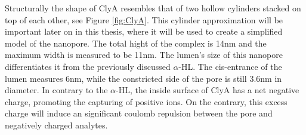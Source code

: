 Structurally the shape of ClyA resembles that of two hollow cylinders stacked on top of
each other, see Figure \ref{fig:ClyA}. This cylinder approximation will be important
later on in this thesis, where
it will be used to create a simplified model of the nanopore. The total hight of the
complex is 14nm and the maximum width is measured to be 11nm. The lumen's size of this
nanopore differentiates it from the previously discussed $\alpha$-HL. The cis-entrance of
the lumen measures 6nm, while the constricted side of the pore is still 3.6nm in
diameter.  In contrary to the $\alpha$-HL, the inside surface of ClyA has a net negative
charge, promoting the capturing of positive ions. On the contrary, this excess charge
will induce an significant coulomb repulsion between the pore and negatively charged
analytes.

